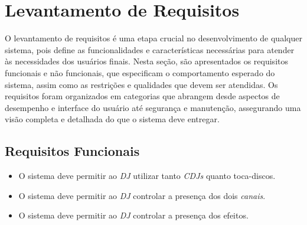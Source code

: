 \section{Levantamento de Requisitos}

O levantamento de requisitos é uma etapa crucial no desenvolvimento de qualquer sistema, pois define as funcionalidades e características necessárias para atender às necessidades dos usuários finais. Nesta seção, são apresentados os requisitos funcionais e não funcionais, que especificam o comportamento esperado do sistema, assim como as restrições e qualidades que devem ser atendidas. Os requisitos foram organizados em categorias que abrangem desde aspectos de desempenho e interface do usuário até segurança e manutenção, assegurando uma visão completa e detalhada do que o sistema deve entregar.

\subsection{Requisitos Funcionais}
\begin{itemize}
    \item O sistema deve permitir ao \textit{DJ} utilizar tanto \textit{CDJs} quanto toca-discos.
    \item O sistema deve permitir ao \textit{DJ} controlar a presença dos dois \textit{canais}.
    \item O sistema deve permitir ao \textit{DJ} controlar a presença dos efeitos.
\end{itemize}

